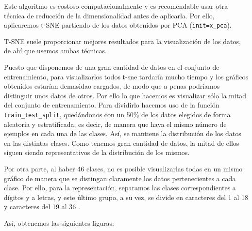 \documentclass[a4]{article}
\begin{document}
Este algoritmo es costoso computacionalmente y es recomendable usar otra técnica de reducción de la dimensionalidad antes de aplicarla. Por ello, aplicaremos t-SNE partiendo de los datos obtenidos por PCA (\lstinline{init=x_pca}). 

T-SNE suele proporcionar mejores resultados para la visualización de los datos, de ahí que usemos ambas técnicas. 

Puesto que disponemos de una gran cantidad de datos en el conjunto de entrenamiento, para visualizarlos todos t-sne tardaría mucho tiempo y los gráficos obtenidos estarían demasidao cargados, de modo que a penas podríamos distinguir unos datos de otros. Por ello lo que hacemos es visualizar sólo la mitad del conjunto de entrenamiento. Para dividirlo hacemos uso de la función \lstinline{train_test_split}, quedándonos con un 50\% de los datos elegidos de forma aleatoria y estratificada, es decir, de manera que haya el mismo número de ejemplos en cada una de las clases. Así, se mantiene la distribución de los datos en las distintas clases. Como tenemos gran cantidad de datos, la mitad de ellos siguen siendo representativos de la distribución de los mismos.

Por otra parte, al haber 46 clases, no es posible visualizarlas todas en un mismo gráfico de manera que se distingan claramente los datos pertenecientes a cada clase. Por ello, para la representación, separamos las clases correspondientes a dígitos y  a letras, y este último grupo, a su vez, se divide en caracteres del 1 al 18 y caracteres del 19 al 36 .


Así, obtenemos las siguientes figuras:
\end{document}
